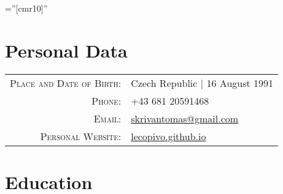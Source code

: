\documentclass[a4paper,10pt]{article} %
\begin{document}


\pagestyle{empty} %

\font\fb=''[cmr10]'' %


\par{\bigskip\par} %

\section{Personal Data}

\begin{tabular}{rl}
  \textsc{Place and Date of Birth:} & Czech Republic  | 16 August 1991 \\
  \textsc{Phone:} & +43 681 20591468\\
  \textsc{Email:} & \href{mailto:skrivantomas@gmail.com}{skrivantomas@gmail.com} \\
  \textsc{Personal Website:} & \href{https://lecopivo.github.io/}{lecopivo.github.io}
\end{tabular}



\section{Education}
\end{document}
